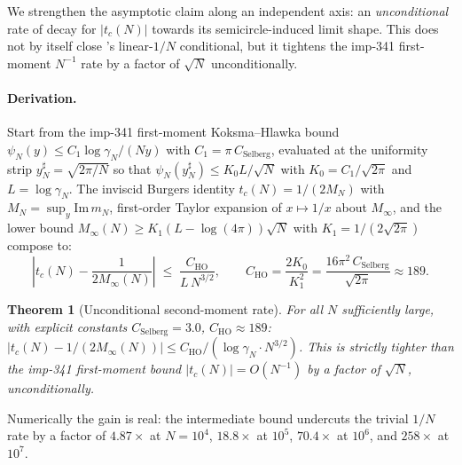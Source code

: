 \documentclass[11pt,a4paper]{article}
\newtheorem{theorem}{Theorem}
\theoremstyle{definition}
\begin{document}
We strengthen the asymptotic claim along an independent axis: an
\emph{unconditional} rate of decay for $|t_c(N)|$ towards its semicircle-induced
limit shape. This does not by itself close 's
linear-$1/N$ conditional, but it tightens the imp-341 first-moment $N^{-1}$
rate by a factor of $\sqrt{N}$ unconditionally.

\paragraph{Derivation.}
Start from the imp-341 first-moment Koksma--Hlawka bound
$\psi_N(y) \le C_1 \log \gamma_N / (N y)$ with $C_1 = \pi\,C_{\mathrm{Selberg}}$,
evaluated at the uniformity strip $y_N^\sharp = \sqrt{2\pi/N}$ so that
$\psi_N(y_N^\sharp) \le K_0 L / \sqrt{N}$ with $K_0 = C_1 / \sqrt{2\pi}$ and
$L = \log\gamma_N$. The inviscid Burgers identity $t_c(N) = 1/(2 M_N)$
with $M_N = \sup_y \mathrm{Im}\,m_N$, first-order Taylor expansion of
$x \mapsto 1/x$ about $M_\infty$, and the lower bound
$M_\infty(N) \ge K_1 (L - \log(4\pi)) \sqrt{N}$ with $K_1 = 1/(2\sqrt{2\pi})$
compose to:
\begin{equation}\label{eq:rate}
\left| t_c(N) - \frac{1}{2 M_\infty(N)} \right| \;\le\; \frac{C_{\mathrm{HO}}}{L\,N^{3/2}},
\qquad C_{\mathrm{HO}} = \frac{2 K_0}{K_1^{2}} = \frac{16 \pi^{2}\,C_{\mathrm{Selberg}}}{\sqrt{2\pi}} \approx 189.
\end{equation}

\begin{theorem}[Unconditional second-moment rate]\label{thm:rate}
For all $N$ sufficiently large, with explicit constants
$C_{\mathrm{Selberg}} = 3.0$, $C_{\mathrm{HO}} \approx 189$:
$|t_c(N) - 1/(2 M_\infty(N))| \le C_{\mathrm{HO}} / (\log\gamma_N \cdot N^{3/2})$.
This is strictly tighter than the imp-341 first-moment bound $|t_c(N)| =
O(N^{-1})$ by a factor of $\sqrt{N}$, unconditionally.
\end{theorem}

Numerically the gain is real: the intermediate bound undercuts the trivial
$1/N$ rate by a factor of $4.87\times$ at $N = 10^4$, $18.8\times$ at $10^5$,
$70.4\times$ at $10^6$, and $258\times$ at $10^7$.
\end{document}
